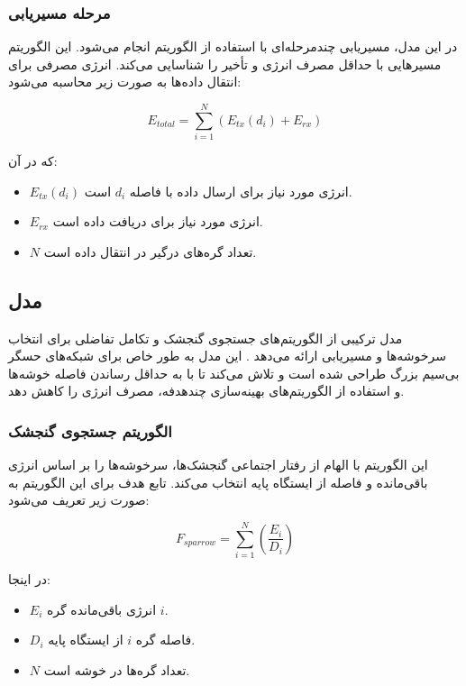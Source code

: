\documentclass[12pt, onecolumn, a4paper]{article}
\begin{document}
\subsubsection{مرحله مسیریابی}
در این مدل، مسیریابی چندمرحله‌ای با استفاده از الگوریتم  انجام می‌شود. این الگوریتم مسیرهایی با حداقل مصرف انرژی و تأخیر را شناسایی می‌کند. انرژی مصرفی برای انتقال داده‌ها به صورت زیر محاسبه می‌شود:

\begin{equation}
	E_{total} = \sum_{i=1}^{N} \left( E_{tx}(d_{i}) + E_{rx} \right)
\end{equation}

که در آن:
\begin{itemize}
	\item $E_{tx}(d_{i})$ انرژی مورد نیاز برای ارسال داده با فاصله $d_{i}$ است.
	\item $E_{rx}$ انرژی مورد نیاز برای دریافت داده است.
	\item $N$ تعداد گره‌های درگیر در انتقال داده است.
\end{itemize}

\subsection{مدل }
مدل  ترکیبی از الگوریتم‌های جستجوی گنجشک و تکامل تفاضلی برای انتخاب سرخوشه‌ها و مسیریابی ارائه می‌دهد \cite{ref5, ref6}. این مدل به طور خاص برای شبکه‌های حسگر بی‌سیم بزرگ طراحی شده است و تلاش می‌کند تا با به حداقل رساندن فاصله خوشه‌ها و استفاده از الگوریتم‌های بهینه‌سازی چندهدفه، مصرف انرژی را کاهش دهد.

\subsubsection{الگوریتم جستجوی گنجشک}
این الگوریتم با الهام از رفتار اجتماعی گنجشک‌ها، سرخوشه‌ها را بر اساس انرژی باقی‌مانده و فاصله از ایستگاه پایه انتخاب می‌کند. تابع هدف برای این الگوریتم به صورت زیر تعریف می‌شود:

\begin{equation}
	F_{sparrow} = \sum_{i=1}^{N} \left( \frac{E_i}{D_i} \right)
\end{equation}

در اینجا:
\begin{itemize}
	\item $E_i$ انرژی باقی‌مانده گره $i$.
	\item $D_i$ فاصله گره $i$ از ایستگاه پایه.
	\item $N$ تعداد گره‌ها در خوشه است.
\end{itemize}
\end{document}

